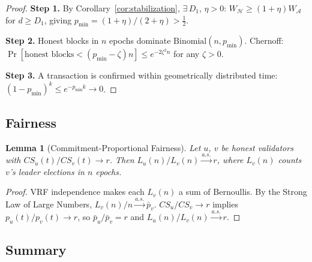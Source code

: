 \documentclass[10pt,journal,twoside]{IEEEtran}
\newtheorem{lemma}[theorem]{Lemma}
\theoremstyle{remark}
\newcommand{\CS}{\mathit{CS}}
\begin{document}
	\begin{proof}
		\textbf{Step 1.} By Corollary~\ref{cor:stabilization},
		$\exists\, D_1$, $\eta > 0$:
		$W_{\mathcal{H}} \geq (1+\eta)W_{\mathcal{A}}$ for
		$d \geq D_1$, giving
		$p_{\min} = (1+\eta)/(2+\eta) > \tfrac{1}{2}$.
		
		\textbf{Step 2.} Honest blocks in $n$ epochs dominate
		$\mathrm{Binomial}(n, p_{\min})$.
		Chernoff: $\Pr[\text{honest blocks} < (p_{\min}-\zeta)n]
		\leq e^{-2\zeta^2 n}$ for any $\zeta > 0$.
		
		\textbf{Step 3.} A transaction is confirmed within
		geometrically distributed time:
		$(1-p_{\min})^k \leq e^{-p_{\min}k} \to 0$.
	\end{proof}
	
	\subsection{Fairness}
	\label{ssec:fairness}
	
	\begin{lemma}[Commitment-Proportional Fairness]
		\label{lem:fairness}
		Let $u$, $v$ be honest validators with
		$\CS_u(t)/\CS_v(t) \to r$.
		Then $L_u(n)/L_v(n) \xrightarrow{a.s.} r$,
		where $L_v(n)$ counts $v$'s leader elections in $n$
		epochs.
	\end{lemma}
	
	\begin{proof}
		VRF independence makes each $L_v(n)$ a sum of
		Bernoullis.
		By the Strong Law of Large Numbers,
		$L_v(n)/n \xrightarrow{a.s.} \bar{p}_v$.
		$\CS_u/\CS_v \to r$ implies $p_u(t)/p_v(t) \to r$,
		so $\bar{p}_u/\bar{p}_v = r$ and
		$L_u(n)/L_v(n) \xrightarrow{a.s.} r$.
	\end{proof}
	
	\subsection{Summary}
	\label{ssec:security-summary}
	
\end{document}

